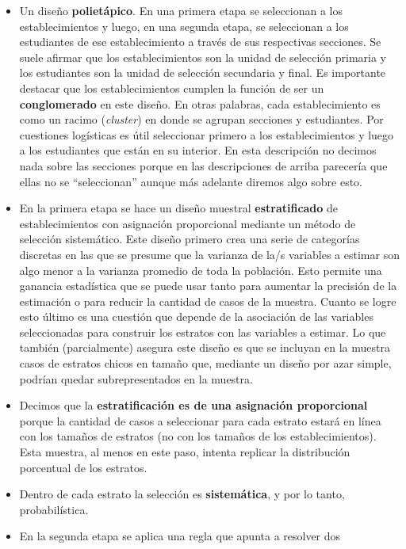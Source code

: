 \documentclass[
  spanish,
  a4paper,
]{scrreprt}
\begin{document}
\begin{itemize}
\item
  Un diseño \textbf{polietápico}. En una primera etapa se seleccionan a
  los establecimientos y luego, en una segunda etapa, se seleccionan a
  los estudiantes de ese establecimiento a través de sus respectivas
  secciones. Se suele afirmar que los establecimientos son la unidad de
  selección primaria y los estudiantes son la unidad de selección
  secundaria y final. Es importante destacar que los establecimientos
  cumplen la función de ser un \textbf{conglomerado} en este diseño. En
  otras palabras, cada establecimiento es como un racimo
  (\emph{cluster}) en donde se agrupan secciones y estudiantes. Por
  cuestiones logísticas es útil seleccionar primero a los
  establecimientos y luego a los estudiantes que están en su interior.
  En esta descripción no decimos nada sobre las secciones porque en las
  descripciones de arriba parecería que ellas no se ``seleccionan''
  aunque más adelante diremos algo sobre esto.
\item
  En la primera etapa se hace un diseño muestral \textbf{estratificado}
  de establecimientos con asignación proporcional mediante un método de
  selección sistemático. Este diseño primero crea una serie de
  categorías discretas en las que se presume que la varianza de la/s
  variables a estimar son algo menor a la varianza promedio de toda la
  población. Esto permite una ganancia estadística que se puede usar
  tanto para aumentar la precisión de la estimación o para reducir la
  cantidad de casos de la muestra. Cuanto se logre esto último es una
  cuestión que depende de la asociación de las variables seleccionadas
  para construir los estratos con las variables a estimar. Lo que
  también (parcialmente) asegura este diseño es que se incluyan en la
  muestra casos de estratos chicos en tamaño que, mediante un diseño por
  azar simple, podrían quedar subrepresentados en la muestra.
\item
  Decimos que la \textbf{estratificación es de una asignación
  proporcional} porque la cantidad de casos a seleccionar para cada
  estrato estará en línea con los tamaños de estratos (no con los
  tamaños de los establecimientos). Esta muestra, al menos en este paso,
  intenta replicar la distribución porcentual de los estratos.
\item
  Dentro de cada estrato la selección es \textbf{sistemática}, y por lo
  tanto, probabilística.
\item
  En la segunda etapa se aplica una regla que apunta a resolver dos

\end{itemize}
\end{document}
